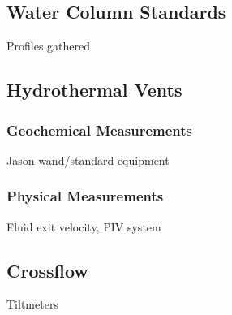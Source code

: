 \subsection{Water Column Standards}
Profiles gathered

\subsection{Hydrothermal Vents}

\subsubsection{Geochemical Measurements}
Jason wand/standard equipment

\subsubsection{Physical Measurements}
Fluid exit velocity, PIV system

\subsection{Crossflow}
Tiltmeters
